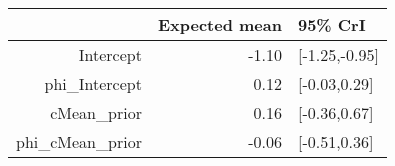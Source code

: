 \begin{tabular}{rrl}
  \hline
 & Expected mean & 95\% CrI \\ 
  \hline
Intercept & -1.10 & [-1.25,-0.95] \\ 
  phi\_Intercept & 0.12 & [-0.03,0.29] \\ 
  cMean\_prior & 0.16 & [-0.36,0.67] \\ 
  phi\_cMean\_prior & -0.06 & [-0.51,0.36] \\ 
   \hline
\end{tabular}

